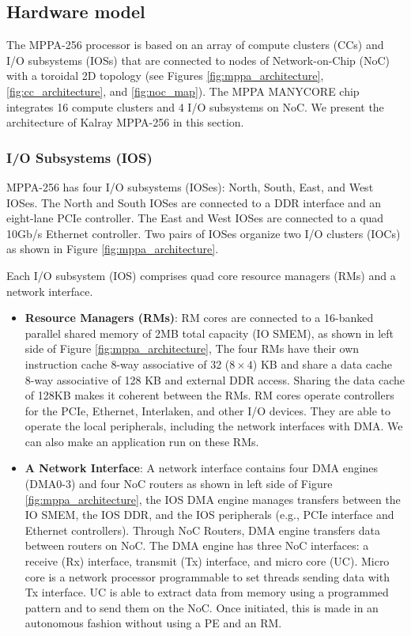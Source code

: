 \documentclass{sig-alternate-05-2015}
\begin{document}
\subsection{Hardware model}
\label{sec:hardware_model}
The MPPA-256 processor is based on an array of compute clusters (CCs) and I/O subsystems (IOSs) that are connected to nodes of Network-on-Chip (NoC) with a toroidal 2D topology 
(see Figures \ref{fig:mppa_architecture}, \ref{fig:cc_architecture}, and \ref{fig:noc_map}).
The MPPA MANYCORE chip integrates 16 compute clusters and 4 I/O subsystems on NoC.
We present the architecture of Kalray MPPA-256 in this section.

\subsubsection{I/O Subsystems (IOS)}
\label{sec:ios}
MPPA-256 has four I/O subsystems (IOSes): North, South, East, and West IOSes.
The North and South IOSes are connected to a DDR interface and an eight-lane PCIe controller.
The East and West IOSes are connected to a quad 10Gb/s Ethernet controller.
Two pairs of IOSes organize two I/O clusters (IOCs) as shown in Figure \ref{fig:mppa_architecture}.

Each I/O subsystem (IOS) comprises quad core resource managers (RMs) and a network interface.
\begin{itemize}
\item \textbf{Resource Managers (RMs)}: RM cores are connected to a 16-banked parallel shared memory of 2MB total capacity (IO SMEM), as shown in left side of Figure \ref{fig:mppa_architecture},
The four RMs have their own instruction cache 8-way associative of 32 ($8 \times 4$) KB and share a data cache 8-way associative of 128 KB and external DDR access.
Sharing the data cache of 128KB makes it coherent between the RMs.
RM cores operate controllers for the PCIe, Ethernet, Interlaken, and other I/O devices.
They are able to operate the local peripherals, including the network interfaces with DMA.
We can also make an application run on these RMs.
\item \textbf{A Network Interface}: A network interface contains four DMA engines (DMA0-3) and four NoC routers as shown in left side of Figure \ref{fig:mppa_architecture},
the IOS DMA engine manages transfers between the IO SMEM, the IOS DDR, and the IOS peripherals (e.g., PCIe interface and Ethernet controllers).
Through NoC Routers, DMA engine transfers data between routers on NoC.
The DMA engine has three NoC interfaces: a receive (Rx) interface, transmit (Tx) interface, and micro core (UC).
Micro core is a network processor programmable to set threads sending data with Tx interface.
UC is able to extract data from memory using a programmed pattern and to send them on the NoC.
Once initiated, this is made in an autonomous fashion without using a PE and an RM.
\end{itemize}
\end{document}
